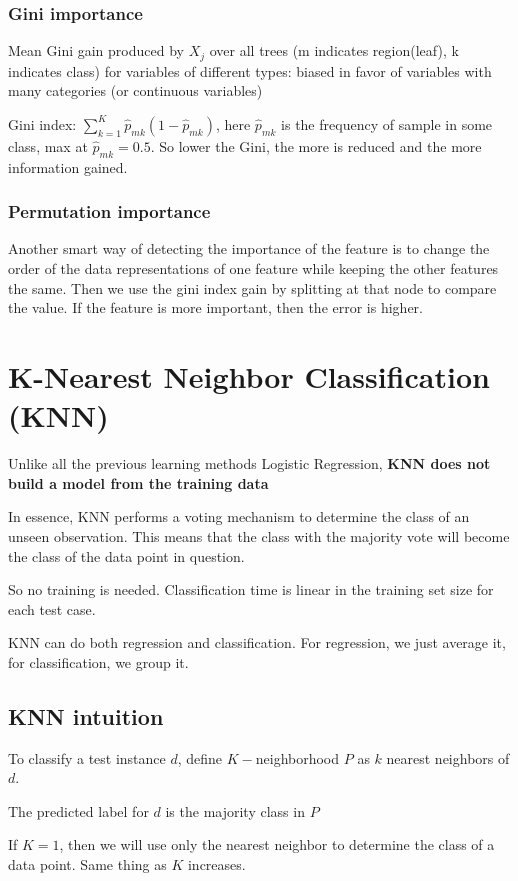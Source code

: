 \documentclass[letterpaper,12pt]{article}
\begin{document}
\subsubsection{Gini importance}
Mean Gini gain produced by $X_j$ over all trees (m indicates region(leaf), k indicates class) for variables of different types: biased in favor of variables with many categories (or continuous variables)

Gini index: $\sum_{k=1}^{K}\hat{p}_{mk}(1-\hat{p}_{mk})$, here $\hat{p}_{mk}$ is the frequency of sample in some class, max at $\hat{p}_{mk}=0.5$. So lower the Gini, the more is reduced and the more information gained. 

\subsubsection{Permutation importance}
Another smart way of detecting the importance of the feature is to change the order of the data representations of one feature while keeping the other features the same. Then we use the gini index gain by splitting at that node to compare the value. If the feature is more important, then the error is higher. 

\section{K-Nearest Neighbor Classification (KNN)}
Unlike all the previous learning methods \- Logistic Regression, \textbf{KNN does not build a model from the training data}

In essence, KNN performs a voting mechanism to determine the class of an unseen observation. This means that the class with the majority vote will become the class of the data point in question. 

So no training is needed. Classification time is linear in the training set size for each test case. 

KNN can do both regression and classification. For regression, we just average it, for classification, we group it. 
\subsection{KNN intuition}
To classify a test instance $d$, define $K-$neighborhood $P$ as $k$ nearest neighbors of $d$. 

The predicted label for $d$ is the majority class in $P$ 

If $K=1$, then we will use only the nearest neighbor to determine the class of a data point. Same thing as $K$ increases. 
\end{document}
